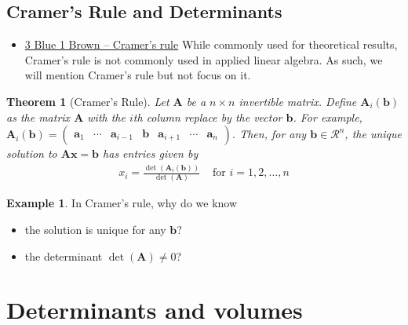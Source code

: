 \documentclass[
]{book}
\providecommand{\tightlist}{%
  \setlength{\itemsep}{0pt}\setlength{\parskip}{0pt}}
\newtheorem{theorem}{Theorem}[chapter]
\theoremstyle{definition}
\theoremstyle{definition}
\newtheorem{example}{Example}[chapter]
\theoremstyle{definition}
\theoremstyle{definition}
\theoremstyle{remark}
\begin{document}
\hypertarget{cramers-rule-and-determinants}{%
\section{Cramer's Rule and Determinants}\label{cramers-rule-and-determinants}}

\begin{itemize}
\tightlist
\item
  \href{https://www.3blue1brown.com/lessons/cramers-rule}{3 Blue 1 Brown -- Cramer's rule}
  While commonly used for theoretical results, Cramer's rule is not commonly used in applied linear algebra. As such, we will mention Cramer's rule but not focus on it.
\end{itemize}

\begin{theorem}[Cramer's Rule]
Let \(\mathbf{A}\) be a \(n \times n\) invertible matrix. Define \(\mathbf{A}_i(\mathbf{b})\) as the matrix \(\mathbf{A}\) with the \(i\)th column replace by the vector \(\mathbf{b}\). For example, \(\mathbf{A}_i(\mathbf{b}) = \begin{pmatrix} \mathbf{a}_1 & \cdots & \mathbf{a}_{i-1} & \mathbf{b} & \mathbf{a}_{i+1} & \cdots & \mathbf{a}_n \end{pmatrix}\). Then, for any \(\mathbf{b} \in \mathcal{R}^n\), the unique solution to \(\mathbf{A} \mathbf{x} = \mathbf{b}\) has entries given by
\[
\begin{aligned}
x_i = \frac{\det(\mathbf{A}_i(\mathbf{b}))}{\det(\mathbf{A})} & \mbox{ for } i = 1, 2, \ldots, n
\end{aligned}
\]
\end{theorem}

\begin{example}

In Cramer's rule, why do we know

\begin{itemize}
\item
  the solution is unique for any \(\mathbf{b}\)?
\item
  the determinant \(\det(\mathbf{A}) \neq 0\)?
\end{itemize}

\end{example}

\hypertarget{determinants-and-volumes}{%
\chapter{Determinants and volumes}\label{determinants-and-volumes}}
\end{document}
